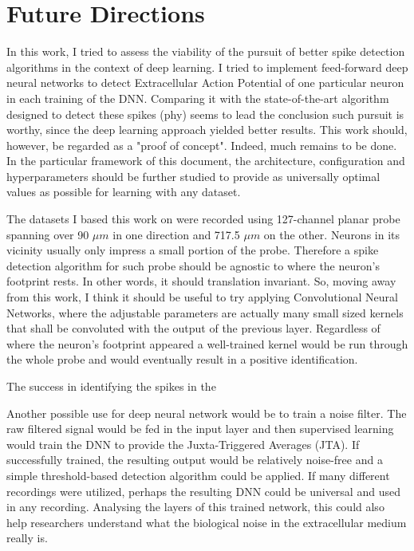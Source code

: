 \label{cap:conclusions}

\section{Future Directions}
In this work, I tried to assess the viability of the pursuit of better spike detection algorithms in the context of deep learning. I tried to implement feed-forward deep neural networks to detect Extracellular Action Potential of one particular neuron in each training of the DNN. Comparing it with the state-of-the-art algorithm designed to detect these spikes (phy) seems to lead the conclusion such pursuit is worthy, since the deep learning approach yielded better results. This work should, however, be regarded as a "proof of concept". Indeed, much remains to be done. In the particular framework of this document, the architecture, configuration and hyperparameters should be further studied to provide as universally optimal values as possible for learning with any dataset.

The datasets I based this work on were recorded using 127-channel planar probe spanning over 90 $\mu m$ in one direction and 717.5 $\mu m$ on the other. Neurons in its vicinity usually only impress a small portion of the probe. Therefore a spike detection algorithm for such probe should be agnostic to where the neuron's footprint rests. In other words, it should translation invariant. So, moving away from this work, I think it should be useful to try applying Convolutional Neural Networks, where the adjustable parameters are actually many small sized kernels that shall be convoluted with the output of the previous layer. Regardless of where the neuron's footprint appeared a well-trained kernel  would be run through the whole probe and would eventually result in a positive identification.

The success in identifying the spikes in the 

Another possible use for deep neural network would be to train a noise filter. The raw filtered signal would be fed in the input layer and then supervised learning would train the DNN to provide the Juxta-Triggered Averages (JTA). If successfully trained, the resulting output would be relatively noise-free and a simple threshold-based detection algorithm could be applied. If many different recordings were utilized, perhaps the resulting DNN could be universal and used in any recording. Analysing the layers of this trained network, this could also help researchers understand what the biological noise in the extracellular medium really is.

\cleardoublepage
